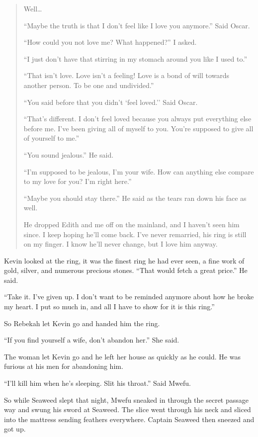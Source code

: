 \begin{quote}

Well\ldots

``Maybe the truth is that I don't feel like I love you anymore.'' Said Oscar.

``How could you not love me? What happened?'' I asked.

``I just don't have that stirring in my stomach around you like I used to.''

``That isn't love. Love isn't a feeling! Love is a bond of will towards another person. To be one and undivided.''

``You said before that you didn't `feel loved.'' Said Oscar.

``That's different. I don't feel loved because you always put everything else before me. I've been giving all of myself to you. You're supposed to give all of yourself to me.''

``You sound jealous.'' He said.

``I'm supposed to be jealous, I'm your wife. How can anything else compare to my love for you? I'm right here.''

``Maybe you should stay there.'' He said as the tears ran down his face as well.

He dropped Edith and me off on the mainland, and I haven't seen him since. I keep hoping he'll come back. I've never remarried, his ring is still on my finger. I know he'll never change, but I love him anyway.

\end{quote}

Kevin looked at the ring, it was the finest ring he had ever seen, a fine work of gold, silver, and numerous precious stones.
``That would fetch a great price.'' He said.

``Take it. I've given up. I don't want to be reminded anymore about how he broke my heart. I put so much in, and all I have to show for it is this ring.''

So Rebekah let Kevin go and handed him the ring.

``If you find yourself a wife, don't abandon her.'' She said.

The woman let Kevin go and he left her house as quickly as he could. He was furious at his men for abandoning him.

\tbreak

``I'll kill him when he's sleeping. Slit his throat.'' Said Mwefu.

So while Seaweed slept that night, Mwefu sneaked in through the secret passage way and swung his sword at Seaweed.
The slice went through his neck and sliced into the mattress sending feathers everywhere. Captain Seaweed then sneezed and got up.

